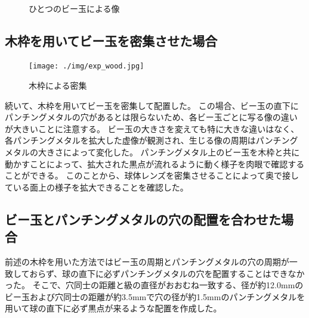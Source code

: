 \begin{figure}[htbp]
  \centering
{}
\\
  \caption{ひとつのビー玉による像}
  \label{FExpSingle}
\end{figure}

\subsection{木枠を用いてビー玉を密集させた場合}
\label{SSWoodframe}

\begin{figure}[htbp]
  \centering
  \texttt{[image: ./img/exp\_wood.jpg]}
  \caption{木枠による密集}
  \label{FExpWood}
\end{figure}

続いて、木枠を用いてビー玉を密集して配置した。
この場合、ビー玉の直下にパンチングメタルの穴があるとは限らないため、各ビー玉ごとに写る像の違いが大きいことに注意する。
ビー玉の大きさを変えても特に大きな違いはなく、各パンチングメタルを拡大した虚像が観測され、生じる像の周期はパンチングメタルの大きさによって変化した。
パンチングメタル上のビー玉を木枠と共に動かすことによって、拡大された黒点が流れるように動く様子を肉眼で確認することができる。
このことから、球体レンズを密集させることによって奥で接している面上の様子を拡大できることを確認した。

\subsection{ビー玉とパンチングメタルの穴の配置を合わせた場合}
\label{SSMarbleOnHole}
前述の木枠を用いた方法ではビー玉の周期とパンチングメタルの穴の周期が一致しておらず、球の直下に必ずパンチングメタルの穴を配置することはできなかった。
そこで、穴同士の距離と級の直径がおおむね一致する、径が約12.0mmのビー玉および穴同士の距離が約3.5mmで穴の径が約1.5mmのパンチングメタルを用いて球の直下に必ず黒点が来るような配置を作成した。

